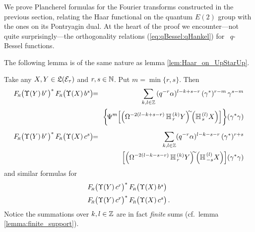 

\begin{abs_chp}
We prove Plancherel formulas for the Fourier transforms
constructed in the previous section, relating the Haar functional
on the quantum $E(2)$ group with the ones on its Pontryagin dual.
At the heart of the proof we encounter---not quite surprisingly---the
orthogonality relations (\ref{eq:qBessel:qHankel}) for
\little\ $q$-Bessel functions.
\end{abs_chp}



The following lemma is of the same nature as lemma \ref{lem:Haar_on_UpStarUp}\@.

\begin{lemma_sec}
Take any\/ $X,Y \in\mathfrak{L}(\mathcal E_\tau)$ and\/ $r, s \in \mathbb{N}$. Put\/ $m=\min\{r,s\}$.
Then
\begin{eqnarray*}
   \FRabb \!\left(\Upsilon(Y)\, b^r \vertM\right)^*
   \FRabb \!\left(\Upsilon(X)\, b^s \vertM\right)
\!\!&=&\!\!
    \sum_{k,l\in\ZZ}  \, (q^{-r} \alpha)^{l-k+s-r} \,
    (\gamma^*)^{r-m} \, \gamma^{s-m}
\\
\!\!&&\!\!
    \left\{ \! \Psi^m \!
    \left[ \left(\Omega^{-2(l-k+s-r)}\, \YaH{r}{k}Y\right)^{\!\!\sim} \!\!
           \left(\YaH{s}{l}X\right)
    \right] \vertXL \! \right\} \! (\gamma^*\gamma)
\\ \vertXL
   \FRabb \!\left(\Upsilon(Y)\, b^r \vertM\right)^*
   \FRabb \!\left(\Upsilon(X)\, c^s \vertM\right)
\!\!&=&\!\!
    \sum_{k,l\in\ZZ}  (q^{-r} \alpha)^{l-k-s-r} \, (\gamma^*)^{r+s}
\\
\!\!&&\!\!
    \left[ \left(\Omega^{-2(l-k-s-r)}\, \YaH{r}{k}Y\right)^{\!\!\sim} \!\!
           \left(\YaH{-s}{l}X\right)
    \right]   \!(\gamma^*\gamma)
\end{eqnarray*}
and similar formulas for
$$ \begin{array}{l}
    \FRabb\! \left(\Upsilon(Y)\, c^r \vertM\right)^*
    \FRabb\! \left(\Upsilon(X)\, b^s \vertM\right)
\\ \vertXL
    \FRabb \!\left(\Upsilon(Y)\, c^r \vertM\right)^*
    \FRabb \!\left(\Upsilon(X)\, c^s \vertM\right).
\end{array} $$
\rm Notice the summations over $k,l\in \mathbb{Z}$ are in fact {\em finite\/} sums
   (cf.\ lemma \ref{lemma:finite_support}).
\end{lemma_sec}


